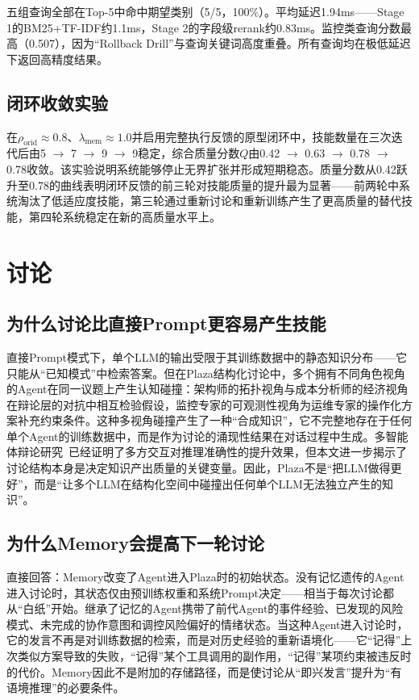 \documentclass[12pt,a4paper]{ctexart}
\begin{document}
五组查询全部在Top-5中命中期望类别（5/5，100\%）。平均延迟1.94ms——Stage 1的BM25+TF-IDF约1.1ms，Stage 2的字段级rerank约0.83ms。监控类查询分数最高（0.507），因为“Rollback Drill”与查询关键词高度重叠。所有查询均在极低延迟下返回高精度结果。

\subsection{闭环收敛实验}

在$\rho_{\text{orid}} \approx 0.8$、$\lambda_{\text{mem}} \approx 1.0$并启用完整执行反馈的原型闭环中，技能数量在三次迭代后由5 $\to$ 7 $\to$ 9 $\to$ 9稳定，综合质量分数$Q$由0.42 $\to$ 0.63 $\to$ 0.78 $\to$ 0.78收敛。该实验说明系统能够停止无界扩张并形成短期稳态。质量分数从0.42跃升至0.78的曲线表明闭环反馈的前三轮对技能质量的提升最为显著——前两轮中系统淘汰了低适应度技能，第三轮通过重新讨论和重新训练产生了更高质量的替代技能，第四轮系统稳定在新的高质量水平上。

\section{讨论}

\subsection{为什么讨论比直接Prompt更容易产生技能}

直接Prompt模式下，单个LLM的输出受限于其训练数据中的静态知识分布——它只能从“已知模式”中检索答案。但在Plaza结构化讨论中，多个拥有不同角色视角的Agent在同一议题上产生认知碰撞：架构师的拓扑视角与成本分析师的经济视角在辩论层的对抗中相互检验假设，监控专家的可观测性视角为运维专家的操作化方案补充约束条件。这种多视角碰撞产生了一种“合成知识”，它不完整地存在于任何单个Agent的训练数据中，而是作为讨论的涌现性结果在对话过程中生成。多智能体辩论研究~\cite{du2023improving,liang2023encouraging,zhang2024reconcile}已经证明了多方交互对推理准确性的提升效果，但本文进一步揭示了讨论结构本身是决定知识产出质量的关键变量。因此，Plaza不是“把LLM做得更好”，而是“让多个LLM在结构化空间中碰撞出任何单个LLM无法独立产生的知识”。

\subsection{为什么Memory会提高下一轮讨论}

直接回答：Memory改变了Agent进入Plaza时的初始状态。没有记忆遗传的Agent进入讨论时，其状态仅由预训练权重和系统Prompt决定——相当于每次讨论都从“白纸”开始。继承了记忆的Agent携带了前代Agent的事件经验、已发现的风险模式、未完成的协作意图和调控风险偏好的情绪状态。当这种Agent进入讨论时，它的发言不再是对训练数据的检索，而是对历史经验的重新语境化——它“记得”上次类似方案导致的失败，“记得”某个工具调用的副作用，“记得”某项约束被违反时的代价。Memory因此不是附加的存储路径，而是使讨论从“即兴发言”提升为“有语境推理”的必要条件。
\end{document}

